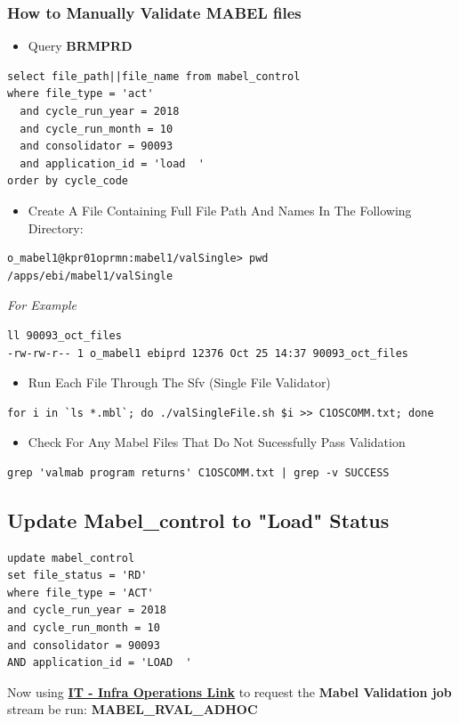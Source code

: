 \documentclass[12pt,twoside]{article}
\begin{document}
\subsubsection{How to Manually Validate MABEL files}
\label{sec:orgheadline56}
\begin{itemize}
\item Query \textbf{BRMPRD}
\end{itemize}
\begin{verbatim}
select file_path||file_name from mabel_control
where file_type = 'act'
  and cycle_run_year = 2018
  and cycle_run_month = 10
  and consolidator = 90093 
  and application_id = 'load  '
order by cycle_code 
\end{verbatim}
\begin{itemize}
\item Create A File Containing Full File Path And Names In The Following Directory:
\end{itemize}
\begin{verbatim}
o_mabel1@kpr01oprmn:mabel1/valSingle> pwd
/apps/ebi/mabel1/valSingle
\end{verbatim}
\emph{For Example}
\begin{verbatim}
ll 90093_oct_files
-rw-rw-r-- 1 o_mabel1 ebiprd 12376 Oct 25 14:37 90093_oct_files
\end{verbatim}
\begin{itemize}
\item Run Each File Through The Sfv (Single File Validator)
\end{itemize}
\begin{verbatim}
for i in `ls *.mbl`; do ./valSingleFile.sh $i >> C1OSCOMM.txt; done
\end{verbatim}
\begin{itemize}
\item Check For Any Mabel Files That Do Not Sucessfully Pass Validation
\end{itemize}
\begin{verbatim}
grep 'valmab program returns' C1OSCOMM.txt | grep -v SUCCESS 
\end{verbatim}
\subsection{Update Mabel\_control to "Load" Status}
\label{sec:orgheadline58}
\begin{verbatim}
update mabel_control
set file_status = 'RD'
where file_type = 'ACT'
and cycle_run_year = 2018
and cycle_run_month = 10
and consolidator = 90093 
AND application_id = 'LOAD  ' 
\end{verbatim}
Now using  \textbf{\href{http://isoc.uscc.com/supportrequestform.php}{IT - Infra Operations Link}} to request the \textbf{Mabel Validation job} stream be run: \textbf{MABEL\_RVAL\_ADHOC}  
\end{document}
